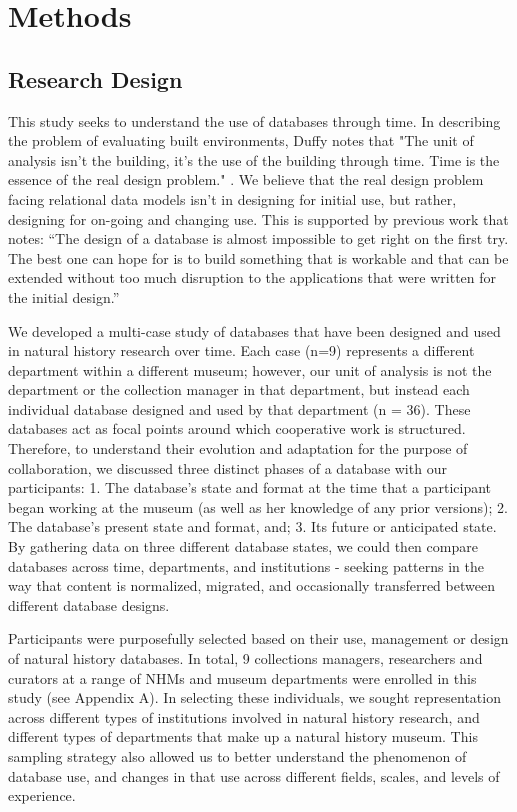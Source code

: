 \section{Methods}

\subsection{Research Design}

This study seeks to understand the use of databases through time. In describing the problem of evaluating built environments, Duffy notes that "The unit of analysis isn't the building, it's the use of the building through time. Time is the essence of the real design problem." \cite{duffy1990measuring}. We believe that the real design problem facing relational data models isn't in designing for initial use, but rather, designing for on-going and changing use. This is supported by previous work that notes: “The design of a database is almost impossible to get right on the first try. The best one can hope for is to build something that is workable and that can be extended without too much disruption to the applications that were written for the initial design.” \cite{buneman2008curated}

We developed a multi-case study of databases that have been designed and used in natural history research over time. Each case (n=9) represents a different department within a different museum; however, our unit of analysis is not the department or the collection manager in that department, but instead each individual database designed and used by that department (n = 36). These databases act as focal points around which cooperative work is structured. Therefore, to understand their evolution and adaptation for the purpose of collaboration, we discussed three distinct phases of a database with our participants: 1. The database's state and format at the time that a participant began working at the museum (as well as her knowledge of any prior versions); 2. The database's present state and format, and; 3. Its future or anticipated state. By gathering data on three different database states, we could then compare databases across time, departments, and institutions - seeking patterns in the way that content is normalized, migrated, and occasionally transferred between different database designs. 

Participants were purposefully selected based on their use, management or design of natural history databases. In total, 9 collections managers, researchers and curators at a range of NHMs and museum departments were enrolled in this study (see Appendix A). In selecting these individuals, we sought representation across different types of institutions involved in natural history research, and different types of departments that make up a natural history museum. This sampling strategy also allowed us to better understand the phenomenon of database use, and changes in that use across different fields, scales, and levels of experience.

